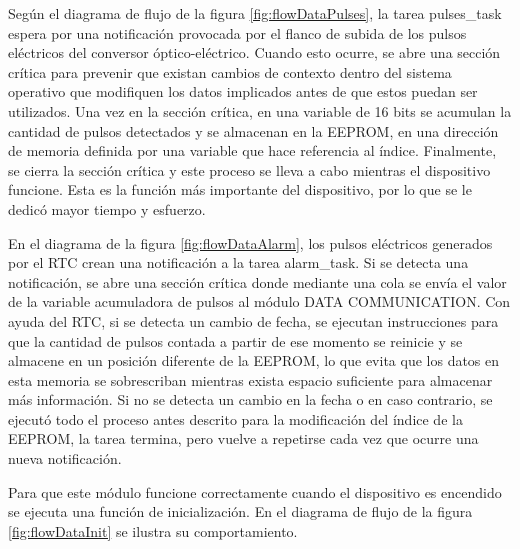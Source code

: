 Según el diagrama de flujo de la figura \ref{fig:flowDataPulses}, la tarea pulses\_task espera por una notificación provocada por el flanco de subida de los pulsos eléctricos del conversor óptico-eléctrico. Cuando esto ocurre, se abre una sección crítica para prevenir que existan cambios de contexto dentro del sistema operativo que modifiquen los datos implicados antes de que estos puedan ser utilizados. Una vez en la sección crítica, en una variable de 16 bits se acumulan la cantidad de pulsos detectados y se almacenan en la EEPROM, en una dirección de memoria definida por una variable que hace referencia al índice. Finalmente, se cierra la sección crítica y este proceso se lleva a cabo mientras el dispositivo funcione. Esta es la función más importante del dispositivo, por lo que se le dedicó mayor tiempo y esfuerzo.

En el diagrama de la figura \ref{fig:flowDataAlarm}, los pulsos eléctricos generados por el RTC crean una notificación a la tarea alarm\_task. Si se detecta una notificación, se abre una sección crítica donde mediante una cola se envía el valor de la variable acumuladora de pulsos al módulo DATA COMMUNICATION. Con ayuda del RTC, si se detecta un cambio de fecha, se ejecutan instrucciones para que la cantidad de pulsos contada a partir de ese momento se reinicie y se almacene en un posición diferente de la EEPROM, lo que evita que los datos en esta memoria se sobrescriban mientras exista espacio suficiente para almacenar más información. Si no se detecta un cambio en la fecha o en caso contrario, se ejecutó todo el proceso antes descrito para la modificación del índice de la EEPROM, la tarea termina, pero vuelve a repetirse cada vez que ocurre una nueva notificación.

Para que este módulo funcione correctamente cuando el dispositivo es encendido se ejecuta una función de inicialización. En el diagrama de flujo de la figura \ref{fig:flowDataInit} se ilustra su comportamiento.

